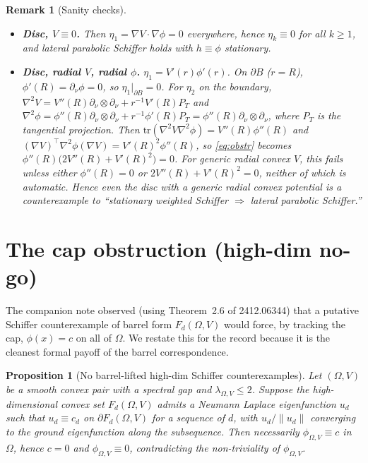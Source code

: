\documentclass[11pt]{article}
\newcommand{\Om}{\Omega}
\newcommand{\1}{\mathbf 1}
\newcommand{\nor}{\partial_\nu}
\newcommand{\tr}{\mathrm{tr}}
\newtheorem{prop}[lem]{Proposition}
\newtheorem{rem}[lem]{Remark}
\begin{document}
\begin{rem}[Sanity checks]\label{rem:checks}
\leavevmode
\begin{itemize}[leftmargin=*]
    \item \textbf{Disc, $V\equiv 0$.} Then $\eta_1=\nabla V\cdot\nabla\phi
    =0$ everywhere, hence $\eta_k\equiv 0$ for all $k\ge 1$, and
    lateral parabolic Schiffer holds with $h\equiv\phi$ stationary.
    \item \textbf{Disc, radial $V$, radial $\phi$.}
    $\eta_1=V'(r)\phi'(r)$. On $\partial B$ ($r=R$),
    $\phi'(R)=\nor\phi=0$, so $\eta_1|_{\partial B}=0$. For $\eta_2$
    on the boundary, $\nabla^2V=V''(R)\nor\otimes\nor+r^{-1}V'(R)P_T$ and
    $\nabla^2\phi=\phi''(R)\nor\otimes\nor+r^{-1}\phi'(R)P_T
    =\phi''(R)\nor\otimes\nor$, where $P_T$ is the tangential
    projection. Then $\tr(\nabla^2V\nabla^2\phi)=V''(R)\phi''(R)$ and
    $(\nabla V)^\top\nabla^2\phi(\nabla V)=V'(R)^2\phi''(R)$, so
    \eqref{eq:obstr} becomes
    $\phi''(R)\bigl(2V''(R)+V'(R)^2\bigr)=0$.
    For \emph{generic} radial convex $V$, this fails unless either
    $\phi''(R)=0$ or $2V''(R)+V'(R)^2=0$, neither of which is
    automatic. Hence even the disc with a generic radial convex
    potential is a counterexample to ``stationary weighted Schiffer
    $\Rightarrow$ lateral parabolic Schiffer.''
\end{itemize}
\end{rem}

\section{The cap obstruction (high-dim no-go)}

The companion note observed (using Theorem~2.6 of 2412.06344) that
a putative Schiffer counterexample of barrel form $F_d(\Om,V)$ would
force, by tracking the cap, $\phi(x)=c$ on all of $\Om$. We restate
this for the record because it is the cleanest formal payoff of the
barrel correspondence.

\begin{prop}[No barrel-lifted high-dim Schiffer counterexamples]\label{prop:cap}
Let $(\Om,V)$ be a smooth convex pair with a spectral gap and
$\lambda_{\Om,V}\le 2$. Suppose the high-dimensional convex set
$F_d(\Om,V)$ admits a Neumann Laplace eigenfunction $u_d$ such that
$u_d\equiv c_d$ on $\partial F_d(\Om,V)$ for a sequence of $d$, with
$u_d/\|u_d\|$ converging to the ground eigenfunction along the
subsequence. Then necessarily $\phi_{\Om,V}\equiv c$ in $\Om$, hence
$c=0$ and $\phi_{\Om,V}\equiv 0$, contradicting the non-triviality of
$\phi_{\Om,V}$.
\end{prop}
\end{document}
